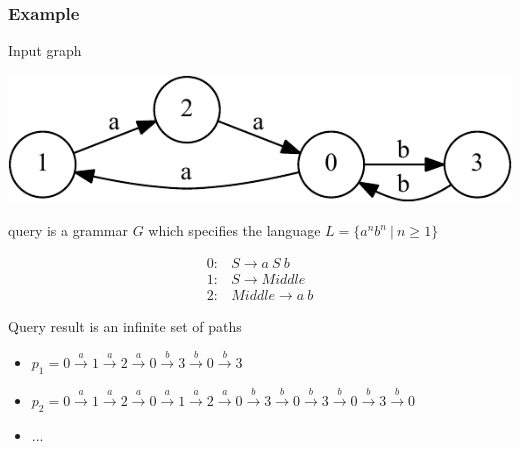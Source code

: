 \documentclass[xcolor=table,aspectratio=169]{beamer}
\begin{document}
\appendix

\begin{frame}[fragile]
  \transwipe[direction=90]
  \frametitle{Example}
Input graph 
\vspace{-0.5cm}
\begin{center}
        \includegraphics[height=0.2\textheight]{pictures/input.pdf} 
\end{center}
query is a grammar $G$ which specifies the language $L=\{a^n b^n \ | \ n \geq 1\}$\\
\begin{center}
   \[
\begin{array}{rl} 
   0:& S \rightarrow a \ S \ b \\
   1:& S \rightarrow Middle \\
   2:& Middle \rightarrow a \ b
\end{array}
\]
\end{center}
\vspace{0.8em}
Query result is an infinite set of paths
\begin{itemize}
\item $p_1 = 0\xrightarrow{a}1\xrightarrow{a}2\xrightarrow{a}0\xrightarrow{b}3\xrightarrow{b}0\xrightarrow{b}3$
\item $p_2 = 0\xrightarrow{a}1\xrightarrow{a}2\xrightarrow{a}0\xrightarrow{a}1\xrightarrow{a}2\xrightarrow{a}0\xrightarrow{b}3\xrightarrow{b}0\xrightarrow{b}3\xrightarrow{b}0\xrightarrow{b}3\xrightarrow{b}0$
\item ...
\end{itemize}

\end{frame}
\end{document}
